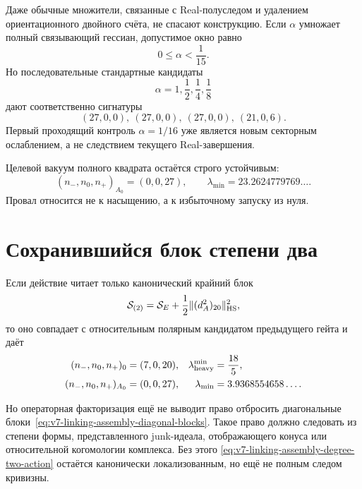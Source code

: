 Даже обычные множители, связанные с Real-полуследом и удалением
ориентационного двойного счёта, не спасают конструкцию. Если $\alpha$
умножает полный связывающий гессиан, допустимое окно равно
\begin{equation}
 0\le\alpha<\frac1{15}.
 \label{eq:v7-linking-assembly-scale-window}
\end{equation}
Но последовательные стандартные кандидаты
\begin{equation}
 \alpha=1,\frac12,\frac14,\frac18
 \label{eq:v7-linking-assembly-standard-scales}
\end{equation}
дают соответственно сигнатуры
\begin{equation}
 (27,0,0),\ (27,0,0),\ (27,0,0),\ (21,0,6).
 \label{eq:v7-linking-assembly-standard-fails}
\end{equation}
Первый проходящий контроль $\alpha=1/16$ уже является новым секторным
ослаблением, а не следствием текущего Real-завершения.

Целевой вакуум полного квадрата остаётся строго устойчивым:
\begin{equation}
 (n_-,n_0,n_+)_{A_0}=(0,0,27),
 \qquad \lambda_{\min}=23.2624779769\ldots.
 \label{eq:v7-linking-assembly-full-vacuum}
\end{equation}
Провал относится не к насыщению, а к избыточному запуску из нуля.

\section{Сохранившийся блок степени два}

Если действие читает только канонический крайний блок
\begin{equation}
 \mathcal S_{(2)}
 =\mathcal S_E+\frac12\|(d_A^2)_{20}\|_{\rm HS}^2,
 \label{eq:v7-linking-assembly-degree-two-action}
\end{equation}
то оно совпадает с относительным полярным кандидатом предыдущего гейта и
даёт
\begin{align}
 (n_-,n_0,n_+)_{0}&=(7,0,20),
 &\lambda_{\rm heavy}^{\min}&=\frac{18}{5},
 \label{eq:v7-linking-assembly-degree-two-origin}\\
 (n_-,n_0,n_+)_{A_0}&=(0,0,27),
 &\lambda_{\min}&=3.9368554658\ldots.
 \label{eq:v7-linking-assembly-degree-two-vacuum}
\end{align}

Но операторная факторизация ещё не выводит право отбросить диагональные
блоки~\eqref{eq:v7-linking-assembly-diagonal-blocks}. Такое право должно
следовать из степени формы, представленного junk-идеала, отображающего
конуса или относительной когомологии комплекса. Без этого
\eqref{eq:v7-linking-assembly-degree-two-action} остаётся канонически
локализованным, но ещё не полным следом кривизны.

